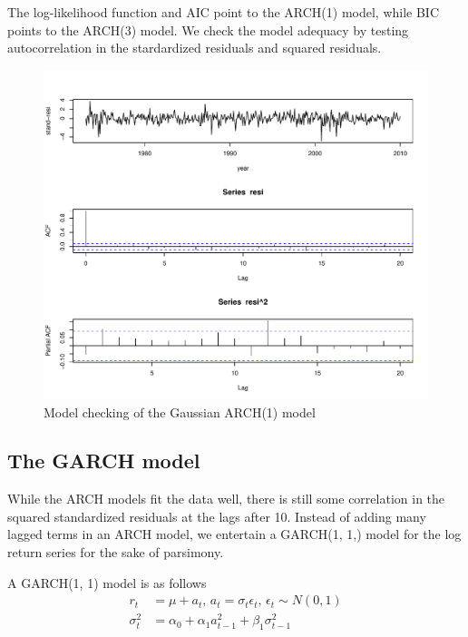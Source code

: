 \documentclass[a4paper,11pt]{article}\usepackage[]{graphicx}\usepackage[]{color}
\makeatletter
\def\maxwidth{ %
  \ifdim\Gin@nat@width>\linewidth
    \linewidth
  \else
    \Gin@nat@width
  \fi
}
\newenvironment{knitrout}{}{} %
\makeatother
\begin{document}
The log-likelihood function and AIC point to the ARCH(1) model, while BIC points to the ARCH(3) model. We check the model adequacy by testing autocorrelation in the stardardized residuals and squared residuals. 

\begin{knitrout}
\color{fgcolor}
\begin{figure}
\includegraphics[width=\maxwidth]{figure/model-checking-resid-1} 
\caption[Model checking of the Gaussian ARCH(1) model]{Model checking of the Gaussian ARCH(1) model}\label{fig:model-checking-resid}
\end{figure}


\end{knitrout}

\subsection*{The GARCH model}

While the ARCH models fit the data well, there is still some correlation in the squared standardized residuals at the lags after 10. Instead of adding many lagged terms in an ARCH model, we entertain a GARCH(1, 1,) model for the log return series for the sake of parsimony. 

A GARCH(1, 1) model is as follows
\begin{align*}
r_t &= \mu + a_t,\, a_t = \sigma_t \epsilon_t,\, \epsilon_t \sim N(0, 1) \\
\sigma^2_t &= \alpha_0 + \alpha_1 a^2_{t-1} + \beta_1 \sigma^2_{t-1}
\end{align*}
\end{document}
